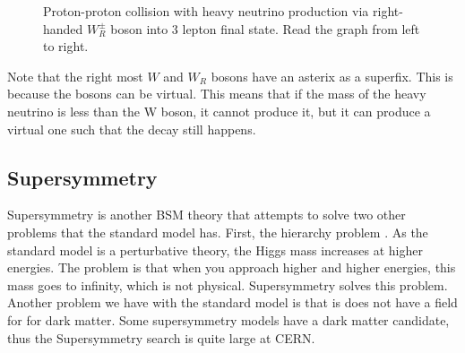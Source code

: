 \begin{figure}[h!]
    \centering
    \caption{Proton-proton collision with heavy neutrino production via right-handed $W_R^{\pm}$ boson into 3 lepton final state. Read the graph from left to right.}

    \label{fig:Target_model_2}
    \end{figure}

Note that the right most $W$ and $W_R$ bosons have an asterix as a superfix. This is because 
the bosons can be virtual. This means that if the mass of the heavy neutrino is less than the W boson,
it cannot produce it, but it can produce a virtual one such that the decay still happens. 

\subsection*{Supersymmetry}
Supersymmetry is another BSM theory that attempts to solve two other problems that the standard model has. 
First, the hierarchy problem . As the standard model is a perturbative theory, the Higgs mass increases at 
higher energies. The problem is that when you approach higher and higher energies, this mass goes to infinity, 
which is not physical. Supersymmetry solves this problem. Another problem we have with the standard model
is that is does not have a field for for dark matter. Some supersymmetry models have a dark matter candidate, 
thus the Supersymmetry search is quite large at CERN. 